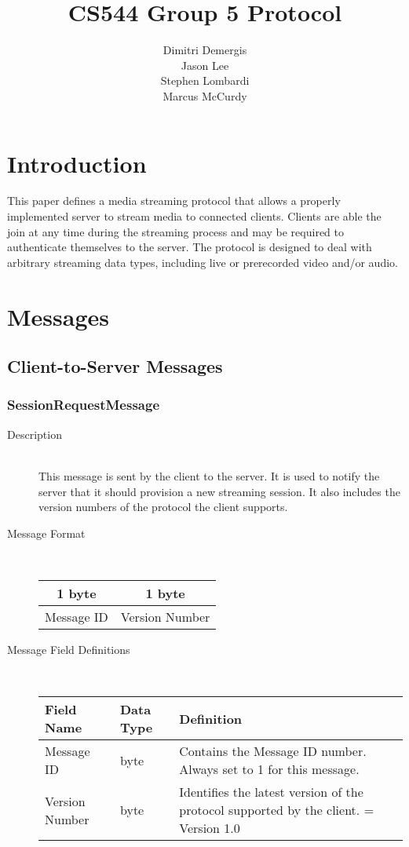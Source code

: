 \documentclass[12pt,letterpaper,titlepage]{article}
\author{Dimitri Demergis \\ Jason Lee \\ Stephen Lombardi \\ Marcus McCurdy}
\title{CS544 Group 5 Protocol}
\begin{document}
\maketitle

\section{Introduction}
This paper defines a media streaming protocol that allows a properly implemented server to stream media to connected clients. Clients are able the join at any time during the streaming process and may be required to authenticate themselves to the server. The protocol is designed to deal with arbitrary streaming data types, including live or prerecorded video and/or audio.

\section{Messages}
\subsection{Client-to-Server Messages}
\subsubsection{SessionRequestMessage}
	\begin{description}
	\item[Description] \hfill \\
		This message is sent by the client to the server.  It is used to notify the server that it 
		should provision a new streaming session. It also includes the version numbers of the 
		protocol the client supports.
	\item[Message Format] \hfill \\
	\begin{tabular}{ | c | c | }
		\hline
		1 byte & 1 byte \\
		\hline
		Message ID &  Version Number \\
		\hline
	\end{tabular}
	\item[Message Field Definitions] \hfill \\
	\begin{tabular}{ | p{3cm} | p{1.5cm} | p{8cm} | }
		\hline
		Field Name & Data Type & Definition \\
		\hline
		Message ID & byte & Contains the Message ID number. \newline Always set to 1 for this message. \\
		\hline
		Version Number & byte & Identifies the latest version of the protocol supported by the client.
						\newline 1 = Version 1.0 \\
		\hline
	\end{tabular}
	\end{description}
\end{document}
